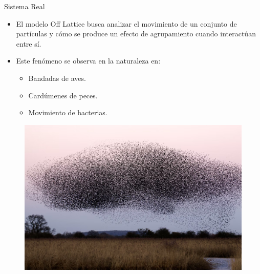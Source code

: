 \documentclass{beamer}
\begin{document}
            \begin{frame}{Sistema Real}
                \begin{itemize}
                    \item El modelo Off Lattice busca analizar el movimiento de un conjunto de partículas y cómo se
                    produce un efecto de agrupamiento cuando interactúan entre sí.
                \end{itemize}
                \begin{minipage}[t]{0.5\textwidth}
                    \begin{itemize}
                        \item Este fenómeno se observa en la naturaleza en:
                        \begin{itemize}
                            \item Bandadas de aves.
                            \item Cardúmenes de peces.
                            \item Movimiento de bacterias.
                        \end{itemize}
                    \end{itemize}
                \end{minipage}
                \hfill
                \begin{minipage}[t]{0.45\textwidth}
                    \begin{figure}[H]
                        \centering
                        \includegraphics[width=\linewidth]{./bandadas_de_aves}
                        \label{fig:bandadas_de_aves}
                    \end{figure}
                \end{minipage}
            \end{frame}
\end{document}
